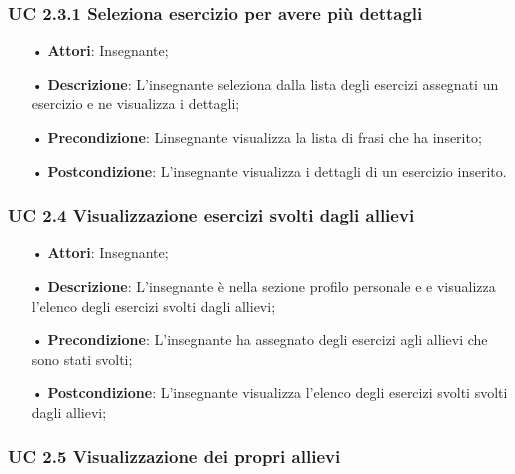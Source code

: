 \subsubsection{UC 2.3.1 Seleziona esercizio per avere più dettagli}
\begin{itemize}
	\item[•] \textbf{Attori}: Insegnante;
	\item[•] \textbf{Descrizione}: L’insegnante seleziona dalla lista degli esercizi assegnati un esercizio e ne visualizza i dettagli;
	\item[•] \textbf{Precondizione}: Linsegnante visualizza la lista di frasi che ha inserito;
	\item[•] \textbf{Postcondizione}: L’insegnante visualizza i dettagli di un esercizio inserito.
\end{itemize}



\subsubsection{UC 2.4 Visualizzazione esercizi svolti dagli allievi}
\begin{itemize}
	\item[•] \textbf{Attori}: Insegnante;
	\item[•] \textbf{Descrizione}:  L’insegnante è nella sezione profilo personale e e visualizza l’elenco degli esercizi svolti dagli allievi;
	\item[•] \textbf{Precondizione}:  L’insegnante ha assegnato degli esercizi agli allievi che sono stati svolti;

	\item[•] \textbf{Postcondizione}: L’insegnante visualizza l'elenco degli esercizi svolti svolti dagli allievi; 	
\end{itemize}

\subsubsection{UC 2.5 Visualizzazione dei propri allievi}


